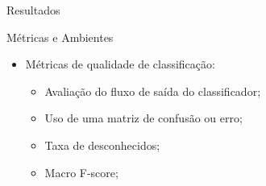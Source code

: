 \documentclass[aspectratio=1610,10pt]{beamer}
\begin{document}
\begin{frame}[fragile]{Resultados}
  \begin{alertblock}{Métricas e Ambientes}
    \begin{itemize}
      \item Métricas de qualidade de classificação:
      \begin{itemize}
        \item Avaliação do fluxo de saída do classificador;
        \item Uso de uma matriz de confusão ou erro;
        \item Taxa de desconhecidos;
        \item Macro F-score;
      \end{itemize}
    \end{itemize}
  \end{alertblock}


\end{frame}
\end{document}
